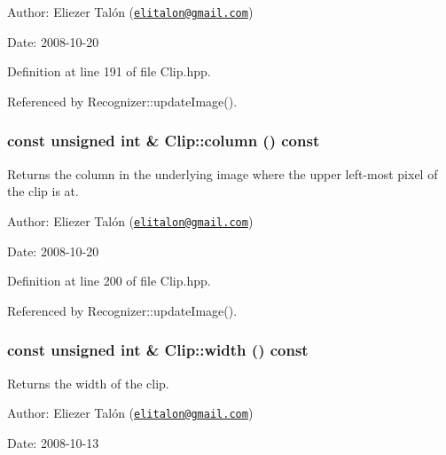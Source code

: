 \begin{Desc}
\item[Author:]Eliezer Talón (\href{mailto:elitalon@gmail.com}{\tt elitalon@gmail.com}) \end{Desc}
\begin{Desc}
\item[Date:]2008-10-20 \end{Desc}


Definition at line 191 of file Clip.hpp.

Referenced by Recognizer::updateImage().\hypertarget{class_clip_06a34378fa0f23425d10bb04e9972a26}{
\subsubsection[column]{\setlength{\rightskip}{0pt plus 5cm}const unsigned int \& Clip::column () const}}
\label{class_clip_06a34378fa0f23425d10bb04e9972a26}


Returns the column in the underlying image where the upper left-most pixel of the clip is at. 

\begin{Desc}
\item[Author:]Eliezer Talón (\href{mailto:elitalon@gmail.com}{\tt elitalon@gmail.com}) \end{Desc}
\begin{Desc}
\item[Date:]2008-10-20 \end{Desc}


Definition at line 200 of file Clip.hpp.

Referenced by Recognizer::updateImage().\hypertarget{class_clip_88d1a47c0ec077e8c6680785509389b0}{
\subsubsection[width]{\setlength{\rightskip}{0pt plus 5cm}const unsigned int \& Clip::width () const}}
\label{class_clip_88d1a47c0ec077e8c6680785509389b0}


Returns the width of the clip. 

\begin{Desc}
\item[Author:]Eliezer Talón (\href{mailto:elitalon@gmail.com}{\tt elitalon@gmail.com}) \end{Desc}
\begin{Desc}
\item[Date:]2008-10-13 \end{Desc}


